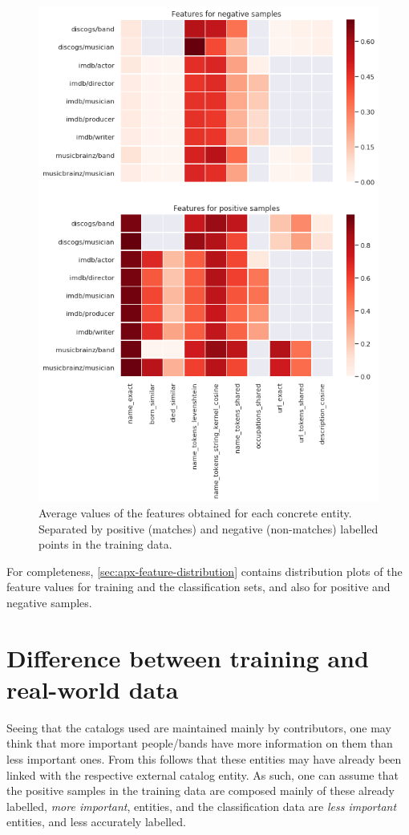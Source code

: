 \documentclass[epsfig,a4paper,11pt,titlepage,twoside,openany]{book}
\begin{document}
\begin{figure}[H]
  \centering \includegraphics[width=.8\textwidth]{feature_heatmap_training_positive_and_negative} 
  \caption{Average values of the features obtained for each concrete entity. Separated by positive (matches) and negative (non-matches) labelled points in the training data.}
  \label{fig:average-features-positive-negative}
\end{figure}

For completeness, \autoref{sec:apx-feature-distribution} contains distribution plots of the feature values for training and the classification sets, and also for positive and negative samples. 


\section{Difference between training and real-world data}
\label{sec:training-real-data-difference}

Seeing that the catalogs used are maintained mainly by contributors, one may think that more important people/bands have more information on them than less important ones. From this follows that these entities may have already been linked with the respective external catalog entity. As such, one can assume that the positive samples in the training data are composed mainly of these already labelled, \textit{more important}, entities, and the classification data are \textit{less important} entities, and less accurately labelled. 
\end{document}
